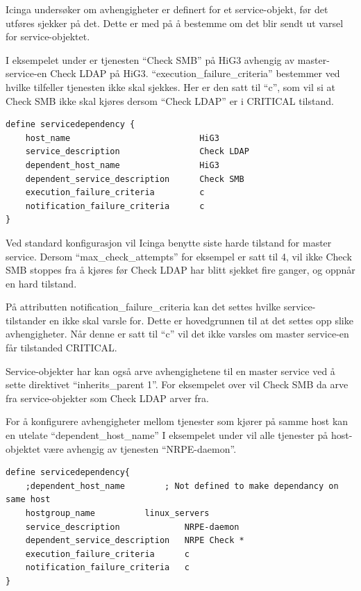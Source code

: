 Icinga undersøker om avhengigheter er definert for et service-objekt, før det utføres sjekker på det. Dette er med på å bestemme om det blir sendt ut varsel for service-objektet.

I eksempelet under er tjenesten ``Check SMB'' på HiG3 avhengig av master-service-en Check LDAP på HiG3. ``execution\_failure\_criteria'' bestemmer ved hvilke tilfeller tjenesten ikke skal sjekkes. Her er den satt til ``c'', som vil si at Check SMB ikke skal kjøres dersom ``Check LDAP'' er i CRITICAL tilstand.

\begin{lstlisting}[style=example]
define servicedependency {
    host_name                          HiG3
    service_description                Check LDAP
    dependent_host_name                HiG3
    dependent_service_description      Check SMB
    execution_failure_criteria         c
    notification_failure_criteria      c
}
\end{lstlisting}

Ved standard konfigurasjon vil Icinga benytte siste harde tilstand for master service. Dersom ``max\_check\_attempts'' for eksempel er satt til 4, vil ikke Check SMB stoppes fra å kjøres før Check LDAP har blitt sjekket fire ganger, og oppnår en hard tilstand. 

På attributten notification\_failure\_criteria kan det settes hvilke service-tilstander en ikke skal varsle for. Dette er hovedgrunnen til at det settes opp slike avhengigheter. Når denne er satt til ``c'' vil det ikke varsles om master service-en får tilstanded CRITICAL.

Service-objekter har kan også arve avhengighetene til en master service ved å sette direktivet ``inherits\_parent 1''. For eksempelet over vil Check SMB da arve fra service-objekter som Check LDAP arver fra.

For å konfigurere avhengigheter mellom tjenester som kjører på samme host kan en utelate ``dependent\_host\_name'' I eksempelet under vil alle tjenester på host-objektet være avhengig av tjenesten ``NRPE-daemon''.

\begin{lstlisting}[style=example]
define servicedependency{
    ;dependent_host_name   	    ; Not defined to make dependancy on same host            
    hostgroup_name 		    linux_servers
    service_description             NRPE-daemon
    dependent_service_description   NRPE Check *
    execution_failure_criteria      c
    notification_failure_criteria   c
}
\end{lstlisting}

